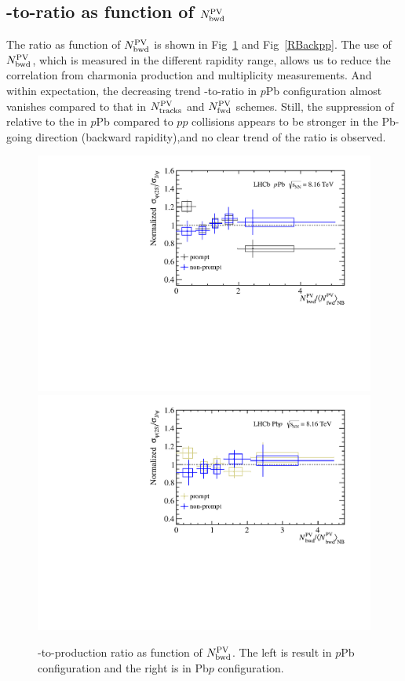 \subsection{\psitwos-to-\jpsi ratio as function of $N^{\rm PV}_{\rm bwd}$}
The ratio as function of $N^{\rm PV}_{\rm bwd}$ is shown in Fig~\ref{RBack} and Fig~\ref{RBackpp}. The use of $N^{\rm PV}_{\rm bwd}$, which is measured in the different rapidity range, allows us to reduce the correlation from charmonia production and multiplicity measurements. And within expectation, the decreasing trend \psitwos-to-\jpsi ratio in $p$Pb configuration almost vanishes compared to that in $N^{\rm PV}_{\rm tracks}$ and $N^{\rm PV}_{\rm fwd}$ schemes. Still,  the suppression of \psitwos relative to the \jpsi in $p$Pb compared to $pp$ collisions appears to be stronger in the Pb-going direction (backward rapidity),and no clear trend of the ratio is observed.
\begin{figure}[H]
  \begin{center}
    \includegraphics[width=0.49\linewidth]{pdf/pPb/BWorkdir/Result/All.pdf}
    \includegraphics[width=0.49\linewidth]{pdf/Pbp/BWorkdir/Result/All.pdf}
    \vspace*{-0.5cm}
  \end{center}
  \caption{\psitwos-to-\jpsi production ratio as function of $N^{\rm PV}_{\rm bwd}$. The left is result in $p$Pb configuration and the right is in Pb$p$ configuration.
    }
  \label{RBack}
\end{figure}

